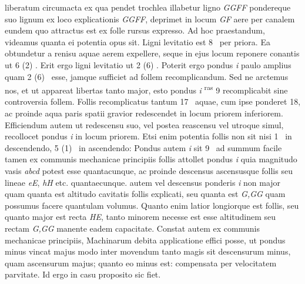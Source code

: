 liberatum circumacta ex qua pendet trochlea\protect{} illabetur ligno \textit{GGFF} pondereque suo lignum ex loco explicationis \textit{GGFF}, deprimet in locum  \textit{GF} aere per canalem eundem quo attractus est ex folle rursus expresso. Ad hoc praestandum, videamus quanta ei potentia opus sit. Ligni levitatio est 8 \Pfund\ per priora. Ea obtundetur a renisu aquae aerem expellere, seque in ejus locum reponere conantis ut 6 (2) \Pfund. Erit ergo ligni levitatio ut 2 (6) \Pfund. Poterit ergo pondus \textit{i} paulo amplius quam 2 (6) \Pfund\ esse, jamque sufficiet ad follem recomplicandum. Sed ne arctemus nos, et ut appareat libertas tanto major, esto pondus \textit{i} \Pfund\textsuperscript{ras} 9 recomplicabit sine controversia follem. Follis recomplicatus  tantum 17 \Pfund\ aquae, cum ipse ponderet 18, ac proinde aqua paris spatii gravior redescendet in locum priorem inferiorem. \pend \pstart Efficiendum autem ut redescensu suo, vel postea reascensu vel utroque simul, recollocet pondus \textit{i} in locum priorem. Etsi enim potentia follis non sit nisi 1 \Pfund\ in descendendo, 5 (1) \Pfund\ in ascendendo: Pondus autem \textit{i} sit 9 \Pfund\ ad summum  facile tamen ex communis mechanicae principiis follis attollet pondus \textit{i} quia magnitudo vasis \textit{abcd} potest esse quantacunque, ac proinde descensus ascensusque follis seu lineae \textit{eE}, \textit{hH} etc. quantaecunque.  autem vel descensus ponderis \textit{i} non major quam quanta est altitudo cavitatis follis explicati, seu quanta est \textit{G,GG} quam possumus facere quantulam volumus. Quanto enim latior longiorque est follis, seu quanto major est recta \textit{HE}, tanto minorem necesse est esse altitudinem seu rectam \textit{G,GG} manente eadem capacitate. Constat autem ex communis mechanicae principiis, Machinarum debita applicatione effici posse, ut pondus minus vincat majus modo inter movendum tanto magis sit descensurum minus, quam ascensurum majus; quanto eo minus est: compensata per velocitatem parvitate. Id ergo in casu proposito sic fiet. 
      \pend 
